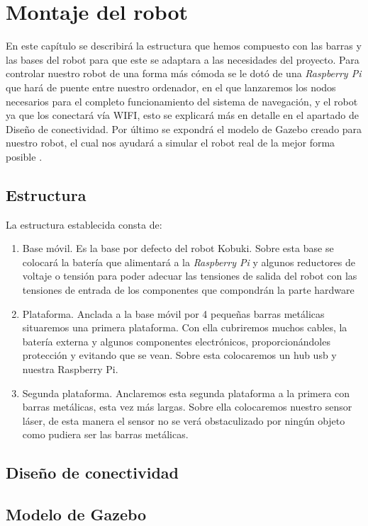 \chapter{Montaje del robot}
\label{cap:montajedelrobot}
En este capítulo se describirá la estructura que hemos compuesto con las barras y las bases del robot para que este se adaptara a las necesidades del proyecto. Para controlar nuestro robot de una forma más cómoda se le dotó de una \textit{Raspberry Pi} que hará de puente entre nuestro ordenador, en el que lanzaremos los nodos necesarios para el completo funcionamiento del sistema de navegación, y el robot ya que los conectará vía WIFI, esto se explicará más en detalle en el apartado de Diseño de conectividad. Por último se expondrá el modelo de Gazebo creado para nuestro robot, el cual nos ayudará a simular el robot real de la mejor forma posible .

\section{Estructura}
\label{cap:estructuradelrobot}
La estructura establecida consta de:
\begin{enumerate}
\item Base móvil. Es la base por defecto del robot Kobuki. Sobre esta base se colocará la batería que alimentará a la \textit{Raspberry Pi} y algunos reductores de voltaje o tensión para poder adecuar las tensiones de salida del robot con las tensiones de entrada de los componentes que compondrán la parte hardware
\item Plataforma. Anclada a la base móvil por 4 pequeñas barras metálicas situaremos una primera plataforma. Con ella cubriremos muchos cables, la batería externa y algunos componentes electrónicos, proporcionándoles protección y evitando que se vean. Sobre esta colocaremos un hub usb y nuestra Raspberry Pi. 
\item Segunda plataforma. Anclaremos esta segunda plataforma a la primera con barras metálicas, esta vez más largas. Sobre ella colocaremos nuestro sensor láser, de esta manera el sensor no se verá obstaculizado por ningún objeto como pudiera ser las barras metálicas.
\end{enumerate}

\section{Diseño de conectividad}
\label{cap:conectividad}

\section{Modelo de Gazebo}
\label{cap:modelodegazebo}

